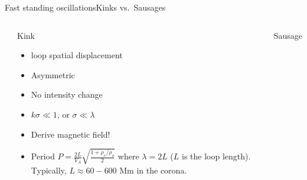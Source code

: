 \documentclass[table]{beamer}
\begin{document}
\begin{frame}[c]{Fast standing oscillations}{Kinks vs.\ Sausages}
    \begin{columns}
        \column{0.5\paperwidth}
        \begin{center}
        \end{center}
        \column{0.5\paperwidth}
        \vspace{-0.5in}
        \begin{block}{Kink}
            \begin{itemize}
                \item loop spatial displacement
                \item Asymmetric
                \item No intensity change
                \item $k\sigma \ll 1$, or $\sigma\ll\lambda$
                \item Derive magnetic field!
        \item Period $P=\frac{2L}{V_A}\sqrt{\frac{1+\rho_e/\rho_o}{2}}$
            where $\lambda=2L$ ($L$ is the loop length).
            Typically, $L \approx 60-600$ Mm in the corona.
            \end{itemize}
        \end{block}
        \begin{block}{Sausage}

\end{block}
\end{columns}
\end{frame}
\end{document}
